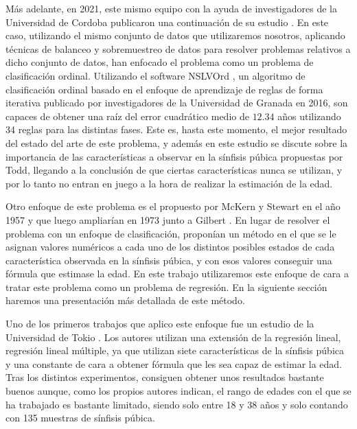 Más adelante, en 2021, este mismo equipo con la ayuda de investigadores de la Universidad de Cordoba publicaron una continuación de su estudio \cite{NSLVOrdAge}. En este caso, utilizando el mismo conjunto de datos que utilizaremos nosotros, aplicando técnicas de balanceo y sobremuestreo de datos para resolver problemas relativos a dicho conjunto de datos, han enfocado el problema como un problema de clasificación ordinal. Utilizando el software NSLVOrd \cite{NSLVOrd}, un algoritmo de clasificación ordinal basado en el enfoque de aprendizaje de reglas de forma iterativa publicado por investigadores de la Universidad de Granada en 2016, son capaces de obtener una raíz del error cuadrático medio de $12.34$ años utilizando 34 reglas para las distintas fases. Este es, hasta este momento, el mejor resultado del estado del arte de este problema, y además en este estudio se discute sobre la importancia de las características a observar en la sínfisis púbica propuestas por Todd, llegando a la conclusión de que ciertas características nunca se utilizan, y por lo tanto no entran en juego a la hora de realizar la estimación de la edad.



Otro enfoque de este problema es el propuesto por McKern y Stewart en el año 1957 \cite{primeraPropuestaMcKern} y que luego ampliarían en 1973 junto a Gilbert \cite{propuestaGilbert}. En lugar de resolver el problema con un enfoque de clasificación, proponían un método en el que se le asignan valores numéricos a cada uno de los distintos posibles estados de cada característica observada en la sínfisis púbica, y con esos valores conseguir una fórmula que estimase la edad. En este trabajo utilizaremos este enfoque de cara a tratar este problema como un problema de regresión. En la siguiente sección haremos una presentación más detallada de este método.

Uno de los primeros trabajos que aplico este enfoque fue un estudio de la Universidad de Tokio \cite{primerTrabajoGilbert}. Los autores utilizan una extensión de la regresión lineal, regresión lineal múltiple, ya que utilizan siete características de la sínfisis púbica y una constante de cara a obtener fórmula que les sea capaz de estimar la edad. Tras los distintos experimentos, consiguen obtener unos resultados bastante buenos aunque, como los propios autores indican, el rango de edades con el que se ha trabajado es bastante limitado, siendo solo entre 18 y 38 años y solo contando con 135 muestras de sínfisis púbica.

